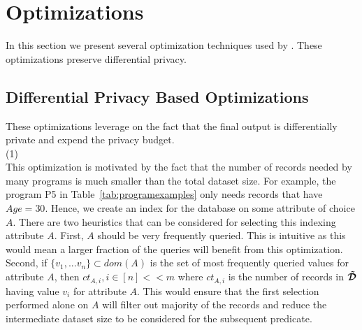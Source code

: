 \section{\system Optimizations}\label{sec:optimization}
In this section we present several optimization techniques used by \system. These optimizations preserve differential privacy.
\subsection*{Differential Privacy Based Optimizations}
These optimizations leverage on the fact that the final output is  differentially private and expend the privacy budget.\\
(1) \\
This optimization is motivated by the fact that the number of records needed by many programs is much smaller than the total dataset size.  For example, the program  P5 in Table~\ref{tab:programexamples} only needs records that have $Age=30$. Hence, we create an index for the database on some attribute of choice $A$. There are two heuristics that can be considered for selecting this indexing attribute $A$. First, $A$ should be very frequently queried. This is intuitive as this would mean a larger fraction of the queries will benefit from this optimization. Second, if $\{v_1,...v_n\} \subset dom(A)$ is the set of most frequently queried values for attribute $A$, then $ct_{A,i}, i \in [n] << m$ where $ct_{A,i}$ is the number of records in $\boldsymbol{\tilde{\mathcal{D}}}$ having value $v_i$ for attribute $A$. This would ensure that the first selection performed alone on $A$ will filter out majority of the records and reduce the intermediate dataset size to be considered for the subsequent predicate. 


